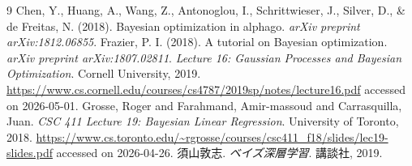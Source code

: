 \documentclass[b5paper,10pt]{jsarticle}
\begin{document}
\begin{thebibliography}{9}
  Chen, Y., Huang, A., Wang, Z., Antonoglou, I., Schrittwieser, J., Silver, D., \& de Freitas, N. (2018). Bayesian optimization in alphago. \textit{arXiv preprint arXiv:1812.06855}.
  Frazier, P. I. (2018). A tutorial on Bayesian optimization. \textit{arXiv preprint arXiv:1807.02811}.
  \textit{Lecture 16: Gaussian Processes and Bayesian Optimization}.
  Cornell University, 2019.
  \url{https://www.cs.cornell.edu/courses/cs4787/2019sp/notes/lecture16.pdf}
  accessed on 2026-05-01.
  Grosse, Roger and Farahmand, Amir-massoud and Carrasquilla, Juan.
  \textit{CSC 411 Lecture 19: Bayesian Linear Regression}.
  University of Toronto, 2018.
  \url{https://www.cs.toronto.edu/~rgrosse/courses/csc411_f18/slides/lec19-slides.pdf}
  accessed on 2026-04-26.
  須山敦志.
  \textit{ベイズ深層学習}.
  講談社, 2019.
\end{thebibliography}
\end{document}
